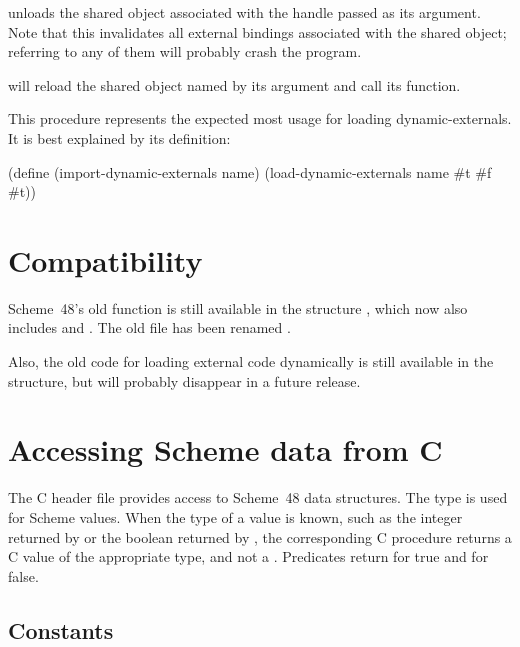  unloads the shared object associated
with the handle passed as its argument.  Note that this invalidates
all external bindings associated with the shared object; referring to
any of them will probably crash the program.

 will reload the shared object named by
its argument and call its  function.

\begin{protos}
\end{protos}
%
This procedure represents the expected most usage for loading
dynamic-externals.  It is best explained by its definition:
%
\begin{example}
(define (import-dynamic-externals name)
  (load-dynamic-externals name #t #f #t))
\end{example}

\section{Compatibility}

Scheme~48's old  function is still available in the
 structure
 , which now also includes  and
 .
The old  file has been renamed .

Also, the old code for loading external code dynamically is still
available in the  structure, but will
probably disappear in a future release.

\section{Accessing Scheme data from C}
\label{sec:scheme-data}

The C header file  provides
 access to Scheme~48 data structures.
The type  is used for Scheme values.
When the type of a value is known, such as the integer returned
 by  or the boolean returned by ,
 the corresponding C procedure returns a C value of the appropriate
 type, and not a .
Predicates return  for true and  for false.

\subsection{Constants}
\label{sec:constants}

